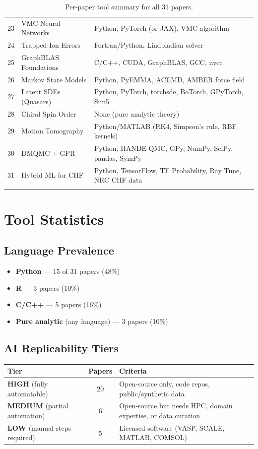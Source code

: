 \documentclass[11pt,letterpaper]{article}
\begin{document}
\begin{longtable}{c p{3cm} p{9cm}}
23 & VMC Neural Networks & Python, PyTorch (or JAX), VMC algorithm \\
24 & Trapped-Ion Errors & Fortran/Python, Lindbladian solver \\
25 & GraphBLAS Foundations & C/C++, CUDA, GraphBLAS, GCC, nvcc \\
26 & Markov State Models & Python, PyEMMA, ACEMD, AMBER force field \\
27 & Latent SDEs (Quasars) & Python, PyTorch, torchsde, BoTorch, GPyTorch, Sim5 \\
28 & Chiral Spin Order & None (pure analytic theory) \\
29 & Motion Tomography & Python/MATLAB (RK4, Simpson's rule, RBF kernels) \\
30 & DMQMC + GPR & Python, HANDE-QMC, GPy, NumPy, SciPy, pandas, SymPy \\
31 & Hybrid ML for CHF & Python, TensorFlow, TF Probability, Ray Tune, NRC CHF data \\
\bottomrule
\caption{Per-paper tool summary for all 31 papers.}
\end{longtable}
\normalsize

\section{Tool Statistics}

\subsection{Language Prevalence}
\begin{itemize}[nosep]
\item \textbf{Python} --- 15 of 31 papers (48\%)
\item \textbf{R} --- 3 papers (10\%)
\item \textbf{C/C++} --- 5 papers (16\%)
\item \textbf{Pure analytic} (any language) --- 3 papers (10\%)
\end{itemize}

\subsection{AI Replicability Tiers}

\begin{longtable}{l c p{8cm}}
\toprule
\textbf{Tier} & \textbf{Papers} & \textbf{Criteria} \\
\midrule
\textbf{HIGH} (fully automatable) & 20 & Open-source only, code repos, public/synthetic data \\
\textbf{MEDIUM} (partial automation) & 6 & Open-source but needs HPC, domain expertise, or data curation \\
\textbf{LOW} (manual steps required) & 5 & Licensed software (VASP, SCALE, MATLAB, COMSOL) \\
\bottomrule
\end{longtable}
\end{document}
